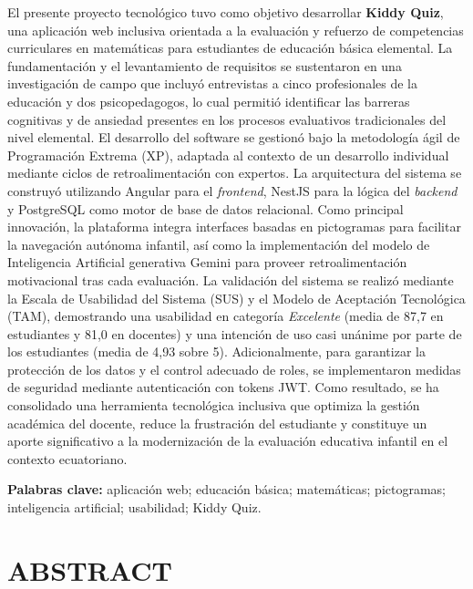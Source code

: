 \documentclass[12pt,a4paper,oneside]{report}
\begin{document}
El presente proyecto tecnológico tuvo como objetivo desarrollar \textbf{Kiddy Quiz}, una aplicación web inclusiva orientada a la evaluación y refuerzo de competencias curriculares en matemáticas para estudiantes de educación básica elemental. La fundamentación y el levantamiento de requisitos se sustentaron en una investigación de campo que incluyó entrevistas a cinco profesionales de la educación y dos psicopedagogos, lo cual permitió identificar las barreras cognitivas y de ansiedad presentes en los procesos evaluativos tradicionales del nivel elemental. El desarrollo del software se gestionó bajo la metodología ágil de Programación Extrema (XP), adaptada al contexto de un desarrollo individual mediante ciclos de retroalimentación con expertos. La arquitectura del sistema se construyó utilizando Angular para el \textit{frontend}, NestJS para la lógica del \textit{backend} y PostgreSQL como motor de base de datos relacional. Como principal innovación, la plataforma integra interfaces basadas en pictogramas para facilitar la navegación autónoma infantil, así como la implementación del modelo de Inteligencia Artificial generativa Gemini para proveer retroalimentación motivacional tras cada evaluación. La validación del sistema se realizó mediante la Escala de Usabilidad del Sistema (SUS) y el Modelo de Aceptación Tecnológica (TAM), demostrando una usabilidad en categoría \textit{Excelente} (media de 87,7 en estudiantes y 81,0 en docentes) y una intención de uso casi unánime por parte de los estudiantes (media de 4,93 sobre 5). Adicionalmente, para garantizar la protección de los datos y el control adecuado de roles, se implementaron medidas de seguridad mediante autenticación con tokens JWT. Como resultado, se ha consolidado una herramienta tecnológica inclusiva que optimiza la gestión académica del docente, reduce la frustración del estudiante y constituye un aporte significativo a la modernización de la evaluación educativa infantil en el contexto ecuatoriano.

\vspace{0.4cm}
\noindent\textbf{Palabras clave:} aplicación web; educación básica; matemáticas; pictogramas; inteligencia artificial; usabilidad; Kiddy Quiz.

\clearpage

\chapter*{ABSTRACT}
\end{document}

